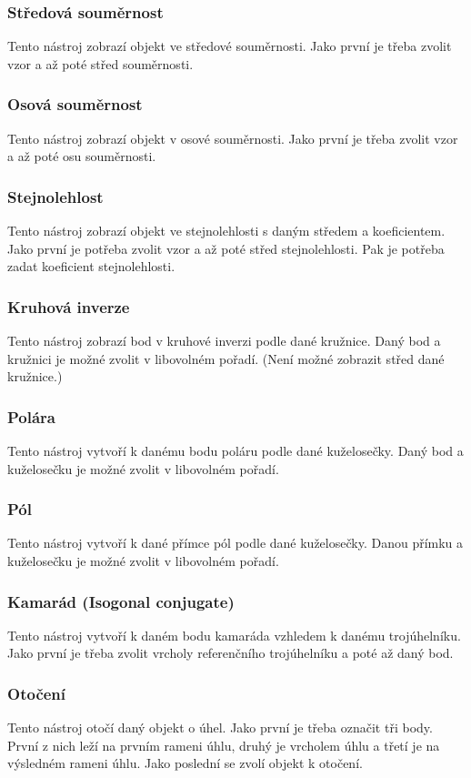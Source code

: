 \documentclass[11pt]{article}
\begin{document}
    \subsubsection{Středová souměrnost}
    Tento nástroj zobrazí objekt ve středové souměrnosti. Jako první je třeba zvolit vzor a až poté střed souměrnosti.
    \subsubsection{Osová souměrnost}
    Tento nástroj zobrazí objekt v osové souměrnosti. Jako první je třeba zvolit vzor a až poté osu souměrnosti.
    \subsubsection{Stejnolehlost}
    Tento nástroj zobrazí objekt ve stejnolehlosti s daným středem a koeficientem. Jako první je potřeba zvolit vzor a až poté střed stejnolehlosti. Pak je potřeba zadat koeficient stejnolehlosti.
    \subsubsection{Kruhová inverze}
    Tento nástroj zobrazí bod v kruhové inverzi podle dané kružnice. Daný bod a kružnici je možné zvolit v libovolném pořadí. (Není možné zobrazit střed dané kružnice.)
    \subsubsection{Polára}
    Tento nástroj vytvoří k danému bodu poláru podle dané kuželosečky. Daný bod a kuželosečku je možné zvolit v libovolném pořadí.
    \subsubsection{Pól}
    Tento nástroj vytvoří k dané přímce pól podle dané kuželosečky. Danou přímku a kuželosečku je možné zvolit v libovolném pořadí.
    \subsubsection{Kamarád (Isogonal conjugate)}
    Tento nástroj vytvoří k daném bodu kamaráda vzhledem k danému trojúhelníku. Jako první je třeba zvolit vrcholy referenčního trojúhelníku a poté až daný bod.
    \subsubsection{Otočení}
    Tento nástroj otočí daný objekt o úhel. Jako první je třeba označit tři body. První z nich leží na prvním rameni úhlu, druhý je vrcholem úhlu a třetí je na výsledném rameni úhlu. Jako poslední se zvolí objekt k otočení.
\end{document}
